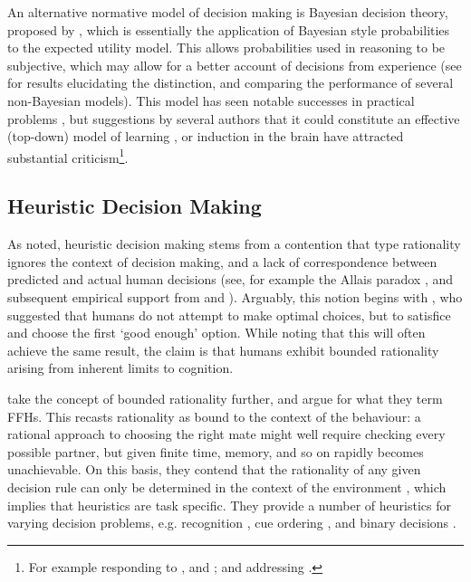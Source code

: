 An alternative normative model of decision making is Bayesian decision theory, proposed by \citet{Robbins1964}, which is essentially the application of Bayesian style probabilities to the expected utility model. This allows probabilities used in reasoning to be subjective, which may allow for a better account of decisions from experience (see \citet{Hertwig2004,Hau2008} for results elucidating the distinction, and comparing the performance of several non-Bayesian models). This model has seen notable successes in practical problems \citep{McNamara1980,Kristensen1997,Survey2003}, but suggestions by several authors  that it could constitute an effective (top-down) model of learning \citep{Tenenbaum2006,Griffiths2010}, or induction \citep{Gallistel2012} in the brain have attracted substantial criticism\footnote{For example \citet{Bowers2012} responding to \citet{Tenenbaum2006}, and \citet{Griffiths2010}; and \citet{Miller2012} addressing \citet{Gallistel2012}.}.

\subsection{Heuristic Decision Making}\label{sub:heuristic_theories}

As noted, heuristic decision making stems from a contention that \citeauthor{Neumann1953} type rationality ignores the context of decision making, and a lack of correspondence between predicted and actual human decisions (see, for example the Allais paradox \citep{Society2013}, and subsequent empirical support from \citet{Burke1996} and \citet{Oliver2003}). Arguably, this notion begins with \citet{Simon1956}, who suggested that humans do not attempt to make optimal choices, but to satisfice and choose the first `good enough' option. While noting that this will often achieve the same result, the claim is that humans exhibit bounded rationality \citep{Simon2000} arising from inherent limits to cognition.

\citet{Gigerenzer1996} take the concept of bounded rationality further, and argue for what they term \acp{FFH}. This recasts rationality as bound to the context of the behaviour: a rational approach to choosing the right mate might well require checking every possible partner, but given finite time, memory, and so on rapidly becomes unachievable. On this basis, they contend that the rationality of any given decision rule can only be determined in the context of the environment \citep{Todd2003}, which implies that heuristics are task specific. They provide a number of heuristics for varying decision problems, e.g. recognition \citep{Goldstein2002}, cue ordering \citep{Gigerenzer1999,Todd2004}, and binary decisions \citep{Brandstatter2006}.

